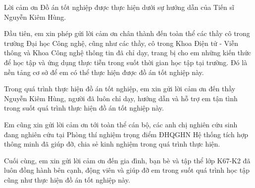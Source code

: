 \documentclass{uetgraduation}
\begin{document}
\begin{preamble}{Lời cảm ơn}
Đồ án tốt nghiệp được thực hiện dưới sự hướng dẫn của Tiến sĩ Nguyễn Kiêm Hùng. 

Đầu tiên, em xin phép gửi lời cảm ơn chân thành đến toàn thể các thầy cô trong trường Đại học Công nghệ, cũng như các thầy, cô trong Khoa Điện tử - Viễn thông và Khoa Công nghệ thông tin đã chỉ dạy, trang bị cho em những kiến thức để học tập và ứng dụng thực tiễn trong suốt thời gian học tập tại trường. Đó là nền tảng cơ sở để em có thể thực hiện được đồ án tốt nghiệp này.

Trong quá trình thực hiện đồ án tốt nghiệp, em xin gửi lời cảm ơn đến thầy Nguyễn Kiêm Hùng, người đã luôn chỉ dạy, hướng dẫn và hỗ trợ em tận tình trong suốt quá trình thực hiện đồ án tốt nghiệp này.

Em cũng xin gửi lời cảm ơn tới toàn thể cán bộ, các anh chị nghiên cứu sinh đang nghiên cứu tại Phòng thí nghiệm trọng điểm ĐHQGHN Hệ thống tích hợp thông minh đã giúp đỡ, chia sẻ kinh nghiệm trong quá trình thực hiện.

Cuối cùng, em xin gửi lời cảm ơn đến gia đình, bạn bè và tập thể lớp K67-K2 đã luôn đồng hành bên cạnh, động viên và giúp đỡ em trong suốt quá trình học tập cũng như thực hiện đồ án tốt nghiệp này. 
\end{preamble}
\end{document}
